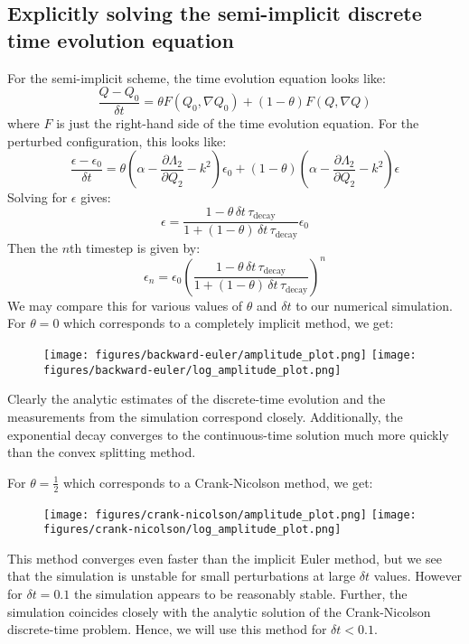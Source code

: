 \documentclass[reqno]{article}
\begin{document}
\subsection{Explicitly solving the semi-implicit discrete time evolution equation}
For the semi-implicit scheme, the time evolution equation looks like:
\begin{equation}
    \frac{Q - Q_0}{\delta t}
    =
    \theta F(Q_0, \nabla Q_0)
    + (1 - \theta) F(Q, \nabla Q)
\end{equation}
where $F$ is just the right-hand side of the time evolution equation.
For the perturbed configuration, this looks like:
\begin{equation}
    \frac{\epsilon - \epsilon_0}{\delta t}
    =
    \theta \left(\alpha - \frac{\partial \Lambda_2}{\partial Q_2} - k^2\right) \epsilon_0
    + (1 - \theta) \left(\alpha - \frac{\partial \Lambda_2}{\partial Q_2} - k^2\right) \epsilon
\end{equation}
Solving for $\epsilon$ gives:
\begin{equation}
    \epsilon
    =
    \frac{1 - \theta \, \delta t \, \tau_\text{decay}}{1 + (1 - \theta) \, \delta t \, \tau_\text{decay}} \epsilon_0
\end{equation}
Then the $n$th timestep is given by:
\begin{equation}
    \epsilon_n
    =
    \epsilon_0 \left(\frac{1 - \theta \, \delta t \, \tau_\text{decay}}{1 + (1 - \theta) \, \delta t \, \tau_\text{decay}}\right)^n 
\end{equation}
We may compare this for various values of $\theta$ and $\delta t$ to our numerical simulation.
For $\theta = 0$ which corresponds to a completely implicit method, we get:
\begin{figure}[H]
    \centering
    \texttt{[image: figures/backward-euler/amplitude\_plot.png]}
    \texttt{[image: figures/backward-euler/log\_amplitude\_plot.png]}
\end{figure}
Clearly the analytic estimates of the discrete-time evolution and the measurements from the simulation correspond closely.
Additionally, the exponential decay converges to the continuous-time solution much more quickly than the convex splitting method.

For $\theta = \frac12$ which corresponds to a Crank-Nicolson method, we get:
\begin{figure}[H]
    \centering
    \texttt{[image: figures/crank-nicolson/amplitude\_plot.png]}
    \texttt{[image: figures/crank-nicolson/log\_amplitude\_plot.png]}
\end{figure}
This method converges even faster than the implicit Euler method, but we see that the simulation is unstable for small perturbations at large $\delta t$ values.
However for $\delta t = 0.1$ the simulation appears to be reasonably stable.
Further, the simulation coincides closely with the analytic solution of the Crank-Nicolson discrete-time problem.
Hence, we will use this method for $\delta t < 0.1$.
\end{document}
